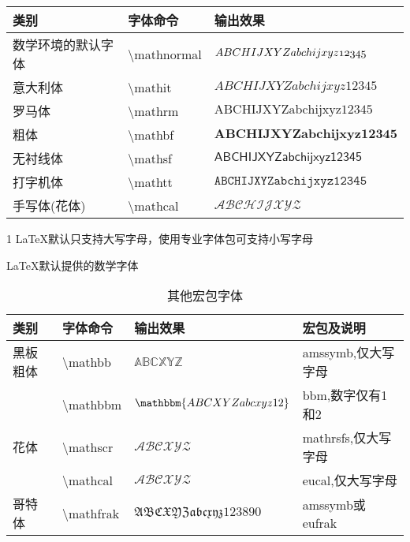 \documentclass[UTF8,fontset=ubuntu]{ctexart}
\begin{document}
\begin{threeparttable}
\begin{tabular}{l l l}
	\hline
	类别 & 字体命令 & 输出效果\\\hline
	数学环境的默认字体 & \textbackslash mathnormal & $\mathnormal{ABCHIJXYZabchijxyz12345}$\\
	意大利体 & \textbackslash mathit & $\mathit{ABCHIJXYZabchijxyz12345}$\\
	罗马体 & \textbackslash mathrm & $\mathrm{ABCHIJXYZabchijxyz12345}$\\
	粗体 & \textbackslash mathbf & $\mathbf{ABCHIJXYZabchijxyz12345}$\\
	无衬线体 & \textbackslash mathsf & $\mathsf{ABCHIJXYZabchijxyz12345}$\\
	打字机体 & \textbackslash mathtt & $\mathtt{ABCHIJXYZabchijxyz12345}$\\
	手写体(花体)\tnote{1} & \textbackslash mathcal & $\mathcal{ABCHIJXYZ}$\\\hline
\end{tabular}
\begin{tablenotes}
	\item[1] LaTeX默认只支持大写字母，使用专业字体包可支持小写字母
\end{tablenotes}
\caption{LaTeX默认提供的数学字体}
\end{threeparttable}
\begin{table}[H]
	\begin{tabular}{l l l l}
		\hline
		类别 & 字体命令 & 输出效果 & 宏包及说明\\\hline
		黑板粗体 & \textbackslash mathbb & $\mathbb{ABCXYZ}$ & amssymb,仅大写字母\\
				 & \textbackslash mathbbm & $\mathbbm{ABCXYZabcxyz12}$ & bbm,数字仅有1和2\\
		花体 & \textbackslash mathscr & $\mathscr{ABCXYZ}$ & mathrsfs,仅大写字母\\
			 & \textbackslash mathcal & $\mathcal{ABCXYZ}$ & eucal,仅大写字母\\
		哥特体 & \textbackslash mathfrak & $\mathfrak{ABCXYZabcxyz123890}$ & amssymb或eufrak\\\hline
	\end{tabular}
	\caption{其他宏包字体}
\end{table}
\end{document}
